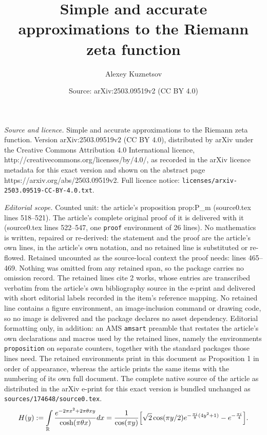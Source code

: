\documentclass[10pt,a4paper]{amsart}
\title{Simple and accurate approximations to the Riemann zeta function}
\author{Alexey Kuznetsov}
\date{Source: arXiv:2503.09519v2 (CC BY 4.0)}
\def\d{{\textnormal d}}
\def\i{{\textnormal i}}
\def\r{{\mathbb R}}
\begin{document}
\maketitle

\noindent\emph{Source and licence.} Simple and accurate approximations to the Riemann zeta function. Version arXiv:2503.09519v2 (CC BY 4.0), distributed by arXiv under the Creative Commons Attribution 4.0 International licence, http://creativecommons.org/licenses/by/4.0/, as recorded in the arXiv licence metadata for this exact version and shown on the abstract page https://arxiv.org/abs/2503.09519v2. Full licence notice: \texttt{licenses/arxiv-2503.09519-CC-BY-4.0.txt}.\par\smallskip

\noindent\textit{Editorial scope.} Counted unit: the article's proposition prop:P\_m (source0.tex lines 518--521). The article's complete original proof of it is delivered with it (source0.tex lines 522--547, one \texttt{proof} environment of 26 lines). No mathematics is written, repaired or re-derived: the statement and the proof are the article's own lines, in the article's own notation, and no retained line is substituted or re-flowed.  Retained uncounted as the source-local context the proof needs: lines 465--469.  Nothing was omitted from any retained span, so the package carries no omission record.  The retained lines cite 2 works, whose entries are transcribed verbatim from the article's own bibliography source in the e-print and delivered with short editorial labels recorded in the item's reference mapping.  No retained line contains a figure environment, an image-inclusion command or drawing code, so no image is delivered and the package declares no asset dependency.  Editorial formatting only, in addition: an AMS \texttt{amsart} preamble that restates the article's own declarations and macros used by the retained lines, namely the environments \texttt{proposition} on separate counters, together with the standard packages those lines need.  The retained environments print in this document as Proposition 1 in order of appearance, whereas the article prints the same items with the numbering of its own full document.  The complete native source of the article as distributed in the arXiv e-print for this exact version is bundled unchanged as \texttt{sources/174648/source0.tex}.
\begin{equation}\label{eqn:Mordell_integral}
H(y):=\int\limits_{\r} \frac{e^{-2\pi x^2+ 2 \pi  \theta  x y }}{\cosh(\pi \theta x)}   \d x=
\frac{1}{\cos(\pi y)} \Big[\sqrt{2} \cos(\pi y/2) e^{-\frac{\pi \i}{8}
(4y^2+1)} -e^{-\frac{\pi \i}{4}}\Big].
\end{equation}
\end{document}
